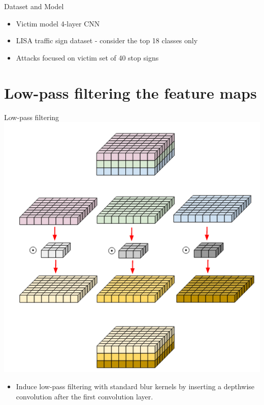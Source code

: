 \documentclass{beamer}
\begin{document}
\begin{frame}{Dataset and Model}
\begin{itemize}
	\item Victim model 4-layer CNN
	\item LISA traffic sign dataset - consider the top 18 classes only
	\item Attacks focused on victim set of 40 stop signs
\end{itemize}
\end{frame}

\section{Low-pass filtering the feature maps}
\begin{frame}{Low-pass filtering}
	\centering
	\includegraphics[scale=0.3]{depthwise_conv.png}
	\begin{itemize}
		\item Induce low-pass filtering with standard blur kernels by inserting a depthwise convolution after the first convolution layer.
	\end{itemize}
\end{frame}
\end{document}
